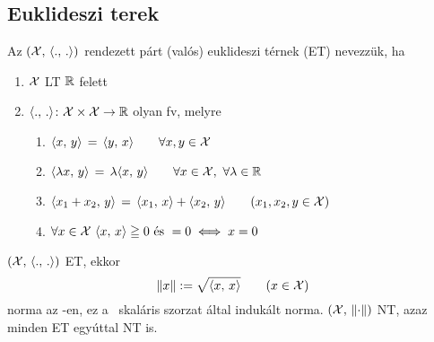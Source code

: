 \subsection{Euklideszi terek}
\begin{de}
  Az $(\mathcal{X},\,\langle.,\,.\rangle)$ rendezett párt (valós) euklideszi térnek (ET) nevezzük, ha
  \begin{enumerate}
  \item $\mathcal{X}$ LT $\mathbb{R}$ felett
  \item $\langle.,\,.\rangle\colon\mathcal{X}\times\mathcal{X}\to\mathbb{R}$ olyan fv, melyre
    \begin{enumerate}
    \item $\langle x,\,y\rangle \,=\,\langle y,\,x\rangle\qquad \forall x,y\in\mathcal{X}$
    \item $\skalar{\lambda x} y \,=\,\lambda\skalar x y\qquad \forall x\in\X,\ \forall\lambda\in\R$
    \item $\langle x_1+x_2,\,y\rangle \,=\,\langle x_1,\,x\rangle + \langle x_2,\,y\rangle \qquad (x_1,x_2,y\in\mathcal{X})$
    \item $\forall x\in\mathcal{X}\ \langle x,\,x\rangle \geqq0 \text{ és } =0\iff x=0$
    \end{enumerate}
  \end{enumerate}
\end{de}

\begin{te}
  $(\mathcal{X},\,\langle.,\,.\rangle)$ ET, ekkor
  \[ \Vert x\Vert := \sqrt{\langle x,\,x\rangle}\qquad(x\in\mathcal{X})\]
  norma az \X-en, ez a \Skalar\ skaláris szorzat által indukált norma. $(\mathcal{X},\,\left\Vert \cdot\right\Vert)$ NT, azaz minden ET egyúttal NT is.
\end{te}

